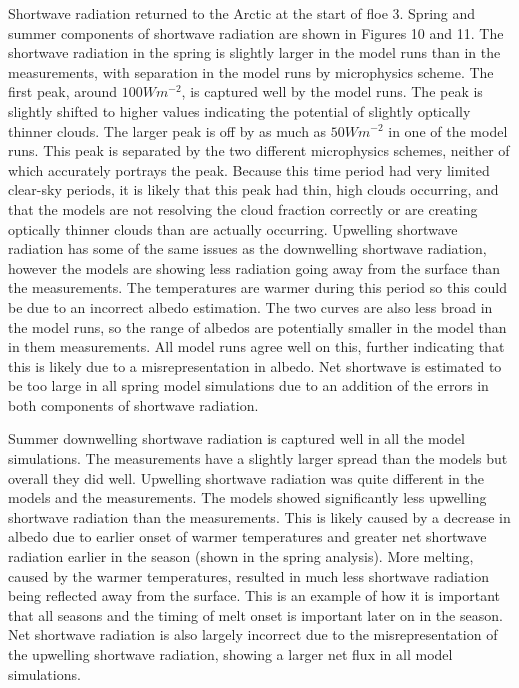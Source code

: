 Shortwave radiation returned to the Arctic at the start of floe 3. Spring and summer components of shortwave radiation are shown in Figures 10 and 11. The shortwave radiation in the spring is slightly larger in the model runs than in the measurements, with separation in the model runs by microphysics scheme. The first peak, around $100 Wm^{-2}$, is captured well by the model runs. The peak is slightly shifted to higher values indicating the potential of slightly optically thinner clouds. The larger peak is off by as much as $50 Wm^{-2}$ in one of the model runs. This peak is separated by the two different microphysics schemes, neither of which accurately portrays the peak. Because this time period had very limited clear-sky periods, it is likely that this peak had thin, high clouds occurring, and that the models are not resolving the cloud fraction correctly or are creating optically thinner clouds than are actually occurring. Upwelling shortwave radiation has some of the same issues as the downwelling shortwave radiation, however the models are showing less radiation going away from the surface than the measurements. The temperatures are warmer during this period so this could be due to an incorrect albedo estimation. The two curves are also less broad in the model runs, so the range of albedos are potentially smaller in the model than in them measurements. All model runs agree well on this, further indicating that this is likely due to a misrepresentation in albedo. Net shortwave is estimated to be too large in all spring model simulations due to an addition of the errors in both components of shortwave radiation. 

Summer downwelling shortwave radiation is captured well in all the model simulations. The measurements have a slightly larger spread than the models but overall they did well. Upwelling shortwave radiation was quite different in the models and the measurements. The models showed significantly less upwelling shortwave radiation than the measurements. This is likely caused by a decrease in albedo due to earlier onset of warmer temperatures and greater net shortwave radiation earlier in the season (shown in the spring analysis). More melting, caused by the warmer temperatures, resulted in much less shortwave radiation being reflected away from the surface. This is an example of how it is important that all seasons and the timing of melt onset is important later on in the season. Net shortwave radiation is also largely incorrect due to the misrepresentation of the upwelling shortwave radiation, showing a larger net flux in all model simulations.


